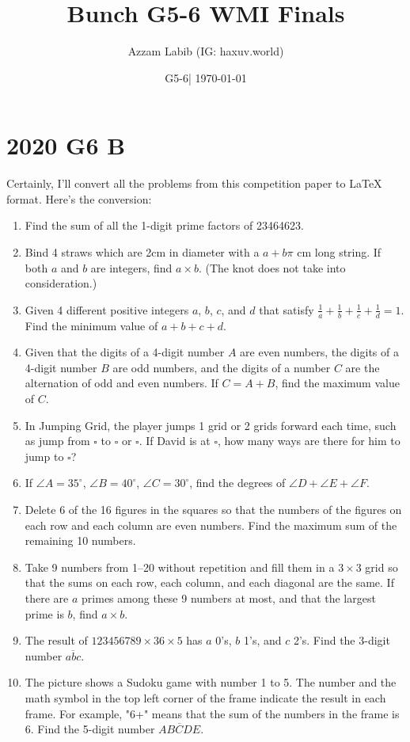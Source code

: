 \documentclass[12pt]{scrartcl}
\title{Bunch G5-6 WMI Finals}
\author{Azzam Labib (IG: haxuv.world)}
\date{G5-6| \today}
\begin{document}
\maketitle

\section{2020 G6 B}
Certainly, I'll convert all the problems from this competition paper to LaTeX format. Here's the conversion:

\begin{enumerate}
    \item Find the sum of all the 1-digit prime factors of 23464623.

    \item Bind 4 straws which are 2cm in diameter with a $a+b\pi$ cm long string. If both $a$ and $b$ are integers, find $a \times b$. (The knot does not take into consideration.)

    \item Given 4 different positive integers $a$, $b$, $c$, and $d$ that satisfy $\frac{1}{a} + \frac{1}{b} + \frac{1}{c} + \frac{1}{d} = 1$. Find the minimum value of $a+b+c+d$.

    \item Given that the digits of a 4-digit number $A$ are even numbers, the digits of a 4-digit number $B$ are odd numbers, and the digits of a number $C$ are the alternation of odd and even numbers. If $C = A + B$, find the maximum value of $C$.

    \item In Jumping Grid, the player jumps 1 grid or 2 grids forward each time, such as jump from $\square$ to $\square$ or $\square$. If David is at $\square$, how many ways are there for him to jump to $\square$?

    \item If $\angle A = 35^\circ$, $\angle B = 40^\circ$, $\angle C = 30^\circ$, find the degrees of $\angle D + \angle E + \angle F$.

    \item Delete 6 of the 16 figures in the squares so that the numbers of the figures on each row and each column are even numbers. Find the maximum sum of the remaining 10 numbers.

    \item Take 9 numbers from 1--20 without repetition and fill them in a $3 \times 3$ grid so that the sums on each row, each column, and each diagonal are the same. If there are $a$ primes among these 9 numbers at most, and that the largest prime is $b$, find $a \times b$.

    \item The result of $123456789 \times 36 \times 5$ has $a$ 0's, $b$ 1's, and $c$ 2's. Find the 3-digit number $\overline{abc}$.

    \item The picture shows a Sudoku game with number 1 to 5. The number and the math symbol in the top left corner of the frame indicate the result in each frame. For example, "6+" means that the sum of the numbers in the frame is 6. Find the 5-digit number $\overline{ABCDE}$.
\end{enumerate}
\end{document}
